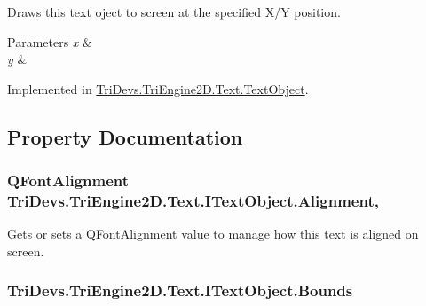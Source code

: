 Draws this text oject to screen at the specified X/\-Y position. 


\begin{DoxyParams}{Parameters}
{\em x} & \\
\hline
{\em y} & \\
\hline
\end{DoxyParams}


Implemented in \hyperlink{class_tri_devs_1_1_tri_engine2_d_1_1_text_1_1_text_object_a7f80fe0e691d20141e24b9bc98dc8a25}{Tri\-Devs.\-Tri\-Engine2\-D.\-Text.\-Text\-Object}.



\subsection{Property Documentation}
\hypertarget{interface_tri_devs_1_1_tri_engine2_d_1_1_text_1_1_i_text_object_aa2a4b5aceaa2e04758aab6a519e9ed04}{
\subsubsection[{Alignment}]{\setlength{\rightskip}{0pt plus 5cm}Q\-Font\-Alignment Tri\-Devs.\-Tri\-Engine2\-D.\-Text.\-I\-Text\-Object.\-Alignment\hspace{0.3cm}{\ttfamily [get]}, {\ttfamily [set]}}}\label{interface_tri_devs_1_1_tri_engine2_d_1_1_text_1_1_i_text_object_aa2a4b5aceaa2e04758aab6a519e9ed04}


Gets or sets a Q\-Font\-Alignment value to manage how this text is aligned on screen. 

\hypertarget{interface_tri_devs_1_1_tri_engine2_d_1_1_text_1_1_i_text_object_a57f3d3a04b695cad0a260ca13cee4062}{
\subsubsection[{Bounds}]{ Tri\-Devs.\-Tri\-Engine2\-D.\-Text.\-I\-Text\-Object.\-Bounds\hspace{0.3cm}{\ttfamily [get]}}}\label{interface_tri_devs_1_1_tri_engine2_d_1_1_text_1_1_i_text_object_a57f3d3a04b695cad0a260ca13cee4062}


